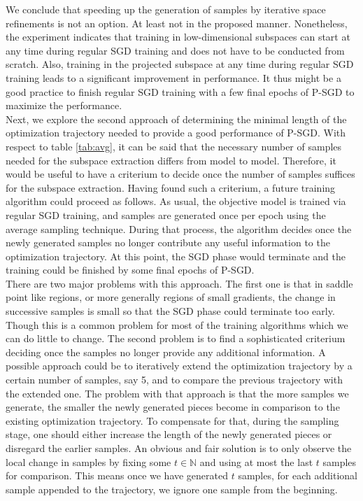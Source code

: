 \documentclass[11pt, a4paper]{article}
\newcommand{\N}{\mathbb{N}}
\begin{document}
We conclude that speeding up the generation of samples by iterative space refinements is not an option. At least not in the proposed manner. Nonetheless, the experiment indicates that training in low-dimensional subspaces can start at any time during regular SGD training and does not have to be conducted from scratch. Also, training in the projected subspace at any time during regular SGD training leads to a significant improvement in performance. It thus might be a good practice to finish regular SGD training with a few final epochs of P-SGD to maximize the performance. \\

Next, we explore the second approach of determining the minimal length of the optimization trajectory needed to provide a good performance of P-SGD. With respect to table \ref{tab:avg}, it can be said that the necessary number of samples needed for the subspace extraction differs from model to model. Therefore, it would be useful to have a criterium to decide once the number of samples suffices for the subspace extraction. Having found such a criterium, a future training algorithm could proceed as follows. As usual, the objective model is trained via regular SGD training, and samples are generated once per epoch using the average sampling technique. During that process, the algorithm decides once the newly generated samples no longer contribute any useful information to the optimization trajectory. At this point, the SGD phase would terminate and the training could be finished by some final epochs of P-SGD. \\

There are two major problems with this approach. The first one is that in saddle point like regions, or more generally regions of small gradients, the change in successive samples is small so that the SGD phase could terminate too early. Though this is a common problem for most of the training algorithms which we can do little to change. The second problem is to find a sophisticated criterium deciding once the samples no longer provide any additional information. A possible approach could be to iteratively extend the optimization trajectory by a certain number of samples, say 5, and to compare the previous trajectory with the extended one. The problem with that approach is that the more samples we generate, the smaller the newly generated pieces become in comparison to the existing optimization trajectory. To compensate for that, during the sampling stage, one should either increase the length of the newly generated pieces or disregard the earlier samples. An obvious and fair solution is to only observe the local change in samples by fixing some $t \in \N$ and using at most the last $t$ samples for comparison. This means once we have generated $t$ samples, for each additional sample appended to the trajectory, we ignore one sample from the beginning. \\
\end{document}
